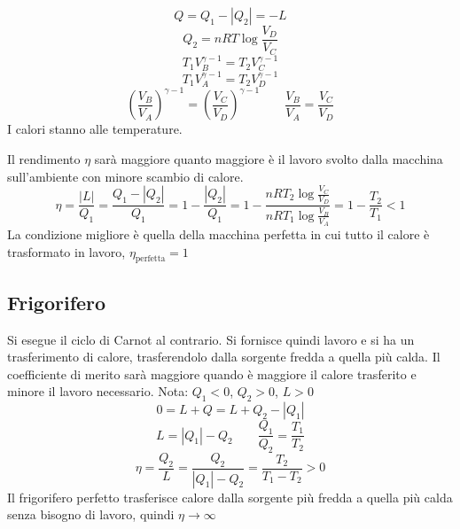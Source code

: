 \begin{equation*}Q=Q_1-|Q_2|=-L\end{equation*}
\begin{equation*}Q_2=nRT\log\frac{V_D}{V_C}\end{equation*}
\begin{equation*}T_1V_B^{\gamma-1}=T_2V_C^{\gamma-1}\end{equation*}
\begin{equation*}T_1V_A^{\gamma-1}=T_2V_D^{\gamma-1}\end{equation*}
\begin{equation*}\left(\frac{V_B}{V_A}\right)^{\gamma-1}=\left(\frac{V_C}{V_D}\right)^{\gamma-1}\qquad \frac{V_B}{V_A}=\frac{V_C}{V_D}\end{equation*}
I calori stanno alle temperature.

Il rendimento $\eta$ sarà maggiore quanto maggiore è il lavoro svolto dalla macchina sull'ambiente con minore scambio di calore.
\begin{equation*}\eta=\frac{|L|}{Q_1}=\frac{Q_1-|Q_2|}{Q_1}=1-\frac{|Q_2|}{Q_1}=1-\frac{nRT_2\log\frac{V_C}{V_D}}{nRT_1\log\frac{V_B}{V_A}}=1-\frac{T_2}{T_1}<1\end{equation*}
La condizione migliore è quella della macchina perfetta in cui tutto il calore è trasformato in lavoro, $\eta_\text{perfetta}= 1$

\subsection{Frigorifero}
Si esegue il ciclo di Carnot al contrario. Si fornisce quindi lavoro e si ha un trasferimento di calore, trasferendolo dalla sorgente fredda a quella più calda.
Il coefficiente di merito sarà maggiore quando è maggiore il calore trasferito e minore il lavoro necessario.
Nota: $Q_1<0$, $Q_2>0$, $L>0$
\begin{equation*}0=L+Q=L+Q_2-|Q_1|\end{equation*}
\begin{equation*}L=|Q_1|-Q_2\qquad\frac{Q_1}{Q_2}=\frac{T_1}{T_2}\end{equation*}
\begin{equation*}\eta=\frac{Q_2}{L}=\frac{Q_2}{|Q_1|-Q_2}=\frac{T_2}{T_1-T_2}>0\end{equation*}
Il frigorifero perfetto trasferisce calore dalla sorgente più fredda a quella più calda senza bisogno di lavoro, quindi $\eta\rightarrow\infty$

